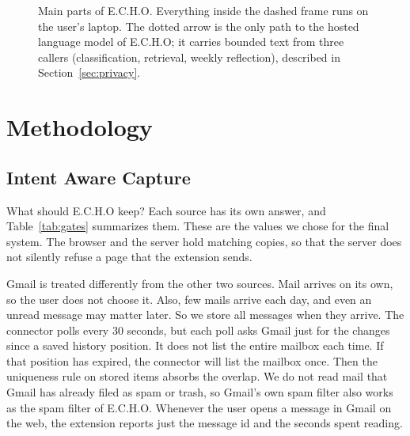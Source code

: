 \documentclass[conference]{IEEEtran}
\begin{document}
\begin{figure}[t]
\caption{Main parts of E.C.H.O. Everything inside the dashed frame runs on the user's laptop. The dotted arrow is the only path to the hosted language model of E.C.H.O; it carries bounded text from three callers (classification, retrieval, weekly reflection), described in Section~\ref{sec:privacy}.}
\label{fig:arch}
\end{figure}

\section{Methodology}\label{sec:method}
\subsection{Intent Aware Capture}
What should E.C.H.O keep? Each source has its own answer, and Table~\ref{tab:gates} summarizes them. These are the values we chose for the final system. The browser and the server hold matching copies, so that the server does not silently refuse a page that the extension sends.

Gmail is treated differently from the other two sources. Mail arrives on its own, so the user does not choose it. Also, few mails arrive each day, and even an unread message may matter later. So we store all messages when they arrive. The connector polls every 30 seconds, but each poll asks Gmail just for the changes since a saved history position. It does not list the entire mailbox each time. If that position has expired, the connector will list the mailbox once. Then the uniqueness rule on stored items absorbs the overlap. We do not read mail that Gmail has already filed as spam or trash, so Gmail's own spam filter also works as the spam filter of E.C.H.O. Whenever the user opens a message in Gmail on the web, the extension reports just the message id and the seconds spent reading.
\end{document}
